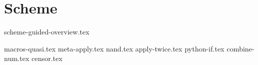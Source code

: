 \documentclass{exam}
\begin{document}
\section{Scheme}
{scheme-guided-overview.tex}
\begin{questions}
{macros-quasi.tex}
{meta-apply.tex}
{nand.tex}
{apply-twice.tex}
{python-if.tex}
{combine-num.tex}
{censor.tex}
\end{questions}
\end{document}
